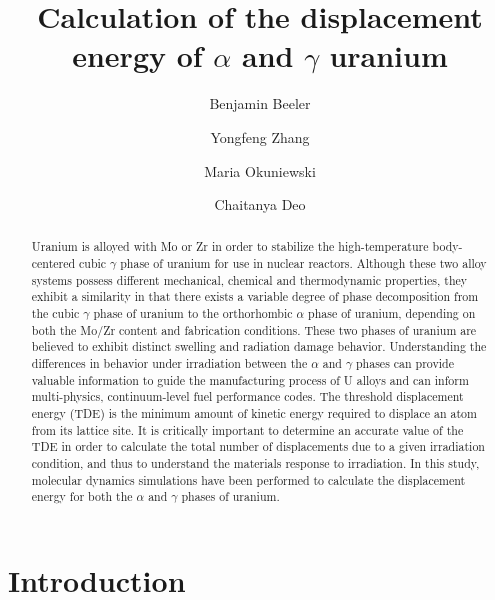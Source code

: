 \documentclass[review]{elsarticle}
\begin{document}
\begin{frontmatter}
\title{Calculation of the displacement energy of $\alpha$ and $\gamma$ uranium}

\author[inl]{Benjamin Beeler}
\author[inl]{Yongfeng Zhang}
\author[pur]{Maria Okuniewski}
\author[gatech]{Chaitanya Deo}
\address[inl]{Idaho National Laboratory, Idaho Falls, ID 83415}
\address[pur]{Purdue University, West Lafayette, IN 47907}
\address[gatech]{Georgia Institute of Technology, Atlanta, GA 30332}

\begin{abstract}

Uranium is alloyed with Mo or Zr in order to stabilize the high-temperature body-centered cubic $\gamma$ phase of uranium for use in nuclear reactors. Although these two alloy systems possess different mechanical, chemical and thermodynamic properties, they exhibit a similarity in that there exists a variable degree of phase decomposition from the cubic $\gamma$ phase of uranium to the orthorhombic $\alpha$ phase of uranium, depending on both the Mo/Zr content and fabrication conditions. These two phases of uranium are believed to exhibit distinct swelling and radiation damage behavior. Understanding the differences in behavior under irradiation between the $\alpha$ and $\gamma$ phases can provide valuable information to guide the manufacturing process of U alloys and can inform multi-physics, continuum-level fuel performance codes. The threshold displacement energy (TDE) is the minimum amount of kinetic energy required to displace an atom from its lattice site. It is critically important to determine an accurate value of the TDE in order to calculate the total number of displacements due to a given irradiation condition, and thus to understand the materials response to irradiation. In this study, molecular dynamics simulations have been performed to calculate the displacement energy for both the $\alpha$ and $\gamma$ phases of uranium. 
\end{abstract}
\end{frontmatter}

\section{Introduction}
\end{document}
